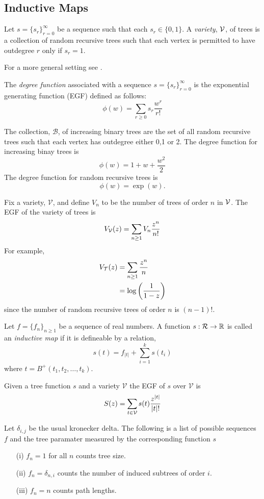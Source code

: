 \subsection{Inductive Maps}
\begin{defn}
 Let $s = \{ s_r\}_{r=0}^{\infty}$ be a sequence such that each $s_r \in \{0,1\}$.  A \emph{variety}, $\operatorname{\mathcal{V}}$, of trees is a 
 collection of random recursive trees such that each vertex is permitted to have outdegree $r$ only if $s_r = 1$. 
\end{defn}
\begin{remk}
 For a more general setting see \cite{Bergeron}.
\end{remk}
The \emph{degree function} associated with a sequence $s= \{ s_r\}_{r=0}^{\infty}$ is the exponential generating function (EGF) defined as follows:
\[
 \phi(w) = \sum_{r \geq 0} s_r \frac{w^r}{r!}
\]

\begin{ex}
 The collection, $\mathcal{B}$, of increasing binary trees are the set of all random recursive trees such that each vertex has 
 outdegree either 0,1 or 2.  The degree function for increasing binay trees is
 \[
  \phi(w) = 1 + w + \frac{w^2}{2}
 \]
The degree function for random recursive trees is
\[
 \phi(w) = \exp(w).
\]
\end{ex}
Fix a variety, $\mathcal{V}$, and define $V_n$ to be the number of trees of order $n$ in $\operatorname{\mathcal{V}}$.  The EGF of the variety of trees 
is 
\[
 V_{\operatorname{\mathcal{V}}}(z) = \sum_{n \geq 1} V_n \frac{z^n}{n!}
\]
For example, 
\begin{align}
V_{\operatorname{\mathcal{T}}}(z) &= \sum_{n\geq 1} \frac{z^n}{n} \\
&= \log\left( \frac{1}{1-z}\right)
\end{align}
since the number of random recursive trees of order $n$ is $(n-1)!$.

\begin{defn}
Let $f = \{f_n\}_{n\geq 1}$ be a sequence of real numbers.  A function $s: \operatorname{\mathcal{R}} \rightarrow \mathbb{R}$ is called an 
\emph{inductive map} if it is defineable by a relation,
\[
 s(t) = f_{\lvert t \rvert} + \sum_{i=1}^k s(t_i)
\]
where $t = B^{+}(t_1,t_2,\dots,t_k)$.
\end{defn}
Given a tree function $s$ and a variety $\mathcal{V}$ the EGF of $s$ over $\mathcal{V}$ is 
\[
 S(z) = \sum_{t \in \operatorname{\mathcal{V}}} s(t) \frac{z^{\lvert t \rvert}}{\lvert t \rvert !}
\]
\begin{ex}
 Let $\delta_{i,j}$ be the usual kronecker delta. The following is a list of possible sequences $f$ and the tree paramater 
 measured by the corresponding function $s$
 \begin{itemize}
  \item[(i)]   $f_n = 1$ for all $n$ counts tree size.
  \item[(ii)] $f_n = \delta_{n,i}$ counts the number of induced subtrees of order $i$.
  \item[(iii)] $f_n = n$ counts path lengths.
 \end{itemize}
 \end{ex}

